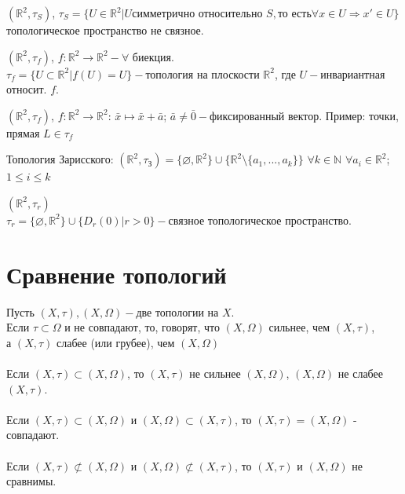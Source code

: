 \documentclass[11pt,fleqn]{book} %
\begin{document}
\begin{example}
$(\mathbb{R}^2,\tau_{S})$,
$\tau_{S}=\{U{\in}\mathbb{R}^2|U\text{симметрично относительно } S, \text{то есть} \forall x{\in}U \Rightarrow x'{\in}U\}$ топологическое пространство не связное.
\end{example}

\begin{example}
$(\mathbb{R}^2,\tau_{f})$, $f: \mathbb{R}^2\to\mathbb{R}^2-\forall$ биекция.\\
$\tau_f=\{U{\subset}\mathbb{R}^2|f(U)=U\}-$топология на плоскости $\mathbb{R}^2$, где $U-$инвариантная относит. $f$.
\end{example}

\begin{example}
$(\mathbb{R}^2,\tau_{f})$, $f:\mathbb{R}^2\to\mathbb{R}^2$: $\bar{x}\mapsto \bar{x}+\bar{a}$; $\bar{a}{\neq}\bar{0}-$фиксированный вектор. Пример: точки, прямая $L{\in}\tau_f$
\end{example}

\begin{example}
Топология Зарисского: $(\mathbb{R}^2,\tau_{\text{З}})=\{\varnothing,\mathbb{R}^2\}{\cup}\{\mathbb{R}^2\setminus\{a_1,...,a_k\}\}$ $\forall k{\in}\mathbb{N}$ $\forall a_i{\in}\mathbb{R}^2$; $1{\leq}i{\leq}k$
\end{example}

\begin{example}
$(\mathbb{R}^2,\tau_{r})$\\
$\tau_r=\{\varnothing,\mathbb{R}^2\}{\cup}\{D_r(0)|r>0\}-$связное топологическое пространство.
\end{example}

\section{Сравнение топологий}
\begin{definition}
Пусть $(X,\tau),(X,\Omega)-$две топологии на $X$.\\
Если $\tau{\subset}\Omega$ и не совпадают, то, говорят, что $(X,\Omega)$ сильнее, чем $(X,\tau)$,\\ а $(X,\tau)$ слабее (или грубее), чем $(X,\Omega)$\\ \\
Если $(X,\tau){\subset}(X,\Omega)$, то $(X,\tau)$ не сильнее $(X,\Omega)$, $(X,\Omega)$ не слабее $(X,\tau)$.\\ \\
Если $(X,\tau){\subset}(X,\Omega)$ и $(X,\Omega)\subset(X,\tau)$, то $(X,\tau)=(X,\Omega)$ - совпадают.\\ \\
Если $(X,\tau){\not\subset}(X,\Omega)$ и $(X,\Omega){\not\subset}(X,\tau)$, то $(X,\tau)$ и $(X,\Omega)$ не сравнимы.
\end{definition}
\end{document}
